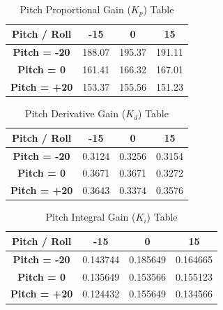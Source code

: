     \begin{table}[H]
    \centering
    \caption{Pitch Proportional Gain ($K_p$) Table}
    \label{tbl:kp_pitch}
    \begin{tabular}{cccc} %
    \toprule %
    \textbf{Pitch / Roll} & \textbf{-15} & \textbf{0} & \textbf{15} \\
    \midrule %
    \textbf{Pitch = -20} & 188.07 & 195.37 & 191.11 \\
    \textbf{Pitch = 0}   & 161.41 & 166.32 & 167.01 \\
    \textbf{Pitch = +20} & 153.37 & 155.56 & 151.23 \\
    \bottomrule %
    \end{tabular}
    \end{table}
    
    \begin{table}[H]
    \centering
    \caption{Pitch Derivative Gain ($K_d$) Table}
    \label{tbl:kd_pitch}
    \begin{tabular}{cccc} %
    \toprule %
    \textbf{Pitch / Roll} & \textbf{-15} & \textbf{0} & \textbf{15} \\
    \midrule %
    \textbf{Pitch = -20} & 0.3124 & 0.3256 & 0.3154 \\
    \textbf{Pitch = 0}   & 0.3671 & 0.3671 & 0.3272 \\
    \textbf{Pitch = +20} & 0.3643 & 0.3374 & 0.3576 \\
    \bottomrule %
    \end{tabular}
    \end{table}
    
    \begin{table}[H]
    \centering
    \caption{Pitch Integral Gain ($K_i$) Table}
    \label{tbl:ki_pitch}
    \begin{tabular}{cccc} %
    \toprule %
    \textbf{Pitch / Roll} & \textbf{-15} & \textbf{0} & \textbf{15} \\
    \midrule %
    \textbf{Pitch = -20} & 0.143744 & 0.185649 & 0.164665 \\
    \textbf{Pitch = 0}   & 0.135649 & 0.153566 & 0.155123 \\
    \textbf{Pitch = +20} & 0.124432 & 0.155649 & 0.134566 \\
    \bottomrule %
    \end{tabular}
    \end{table}

